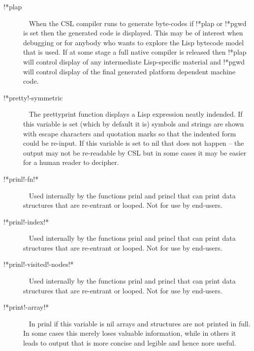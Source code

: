 \documentclass[a4paper,11pt]{article}
\begin{document}
\begin{description}
\item [{\ttfamily !*plap}]  ~\newline
When the CSL compiler runs to generate byte-codes if {\ttfamily !*plap} or
{\ttfamily !*pgwd} is set then the generated code is displayed. This may
be of interest when debugging or for anybody who wants to explore the
Lisp bytecode model that is used. If at some stage a full native compiler
is released then {\ttfamily !*plap} will control display of any intermediate
Lisp-specific material and {\ttfamily !*pgwd} will control display of the
final generated platform dependent machine code.

\item [{\ttfamily !*pretty!-symmetric}]  ~\newline
The {\ttfamily prettyprint} function displays a Lisp expression neatly
indended. If this variable is set (which by default it is) symbols and
strings are shown with escape characters and quotation marks so that the
indented form could be re-input. If this variable is set to {\ttfamily nil}
that does not happen -- the output may not be re-readable by CSL but in
some cases it may be easier for a human reader to decipher.

\item [{\ttfamily !*prinl!-fn!*}]  ~\newline
Used internally by the functions {\ttfamily prinl} and {\ttfamily princl}
that can print data structures that are re-entrant or looped. Not for use
by end-users.

\item [{\ttfamily !*prinl!-index!*}]  ~\newline
Used internally by the functions {\ttfamily prinl} and {\ttfamily princl}
that can print data structures that are re-entrant or looped. Not for use
by end-users.

\item [{\ttfamily !*prinl!-visited!-nodes!*}]  ~\newline
Used internally by the functions {\ttfamily prinl} and {\ttfamily princl}
that can print data structures that are re-entrant or looped. Not for use
by end-users.

\item [{\ttfamily !*print!-array!*}]  ~\newline
In {\ttfamily prinl} if this variable is {\ttfamily nil} arrays and
structures are not printed in full. In some cases this merely loses valuable
information, while in others it leads to output that is more concise and
legible and hence nore useful.


\end{description}
\end{document}
